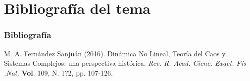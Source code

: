 \documentclass{beamer}
\begin{document}
\section{Bibliograf\'ia del tema}
\begin{frame}
	\frametitle{Bibliograf\'ia}
	\begin{thebibliography}{99}

		 M. A. Fern\'andez Sanju\'an (2016). Din\'amica No Lineal, Teor\'ia del Caos y Sistemas Complejos: una perspectiva hist\'orica. {\em Rev. R. Acad. Cienc. Exact. F\'is .Nat.} \textbf{Vol}. 109, N. 1?2, pp. 107-126.
	\end{thebibliography}
\end{frame}
\end{document}
